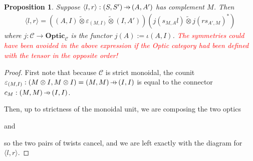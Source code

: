 \documentclass[11pt,a4paper]{article}
\theoremstyle{plain}
\newtheorem{proposition}[theorem]{Proposition}
\theoremstyle{definition}
\newcommand{\C}{\mathscr{C}}
\newcommand{\Optic}{\mathbf{Optic}}
\newcommand{\switched}{\mathbin{\tilde{\otimes}}}
\newcommand{\hto}{\ensuremath{\,\mathaccent\shortmid\rightarrow\,}}
\newcommand{\todo}[1]{\textcolor{red}{\small #1}}
\begin{document}
%
%
%

\begin{proposition}
\label{prop-optic-decompose}
Suppose $\langle l, r \rangle : (S, S') \hto (A, A')$ has complement $M$. Then 
\begin{align*}
\langle l, r \rangle = ((A, I) \switched \varepsilon_{(M, I)} \switched (I, A'))(j(s_{M,A}l) \switched j(rs_{A',M})^*)
\end{align*}
where $j : \C \to \Optic_\C$ is the functor $j(A) := \iota(A, I)$.
\todo{The symmetries could have been avoided in the above expression if the Optic category had been defined with the tensor in the opposite order!}
\end{proposition}
\begin{proof}
First note that because $\C$ is strict monoidal, the counit $\varepsilon_{(M, I)} : (M \otimes I, M \otimes I) = (M, M) \hto (I, I)$ is equal to the connector $c_M : (M, M) \hto (I, I)$.

Then, up to strictness of the monoidal unit, we are composing the two optics
\begin{center}

\end{center}
and
\begin{center}

\end{center}
so the two pairs of twists cancel, and we are left exactly with the diagram for $\langle l, r \rangle$.
\end{proof}
\end{document}
